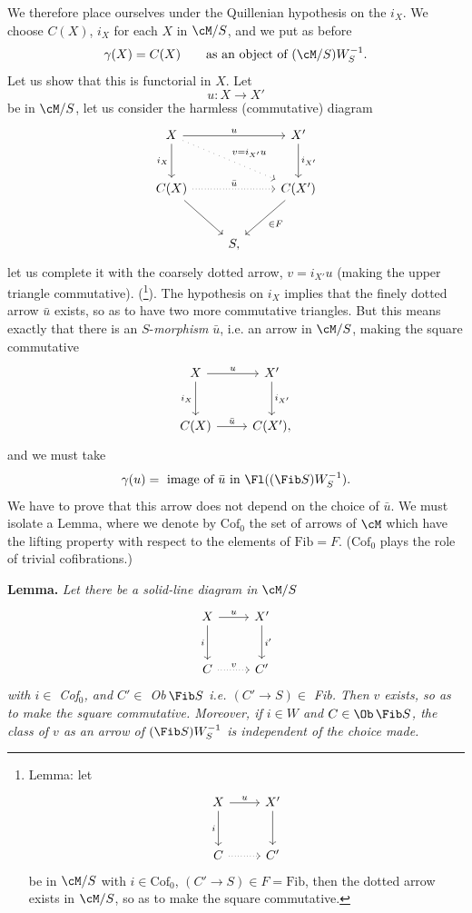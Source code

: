 We therefore place ourselves under the Quillenian hypothesis on the $i_X$. We choose $C(X)$, $i_X$ for
each $X$ in $\cM/S$, and we put as before
\[
\gamma(X)=C(X) \qquad \text{as an object of $(\cM/S)W_S^{-1}$.}
\]
Let us show that this is functorial in $X$. Let
\[
u:X\longrightarrow X'
\]
be in $\cM/S$, let us consider the harmless (commutative) diagram
\[
\begin{tikzcd}[row sep=large]
X \arrow[rr, "u"] \arrow[d, "i_X"'] \arrow[drr, loosely dotted, "v=i_{X'}u"] & & X' \arrow[d, "i_{X'}"] \\
C(X) \arrow[rr, dotted, "\bar{u}"] \arrow[dr] & & C(X') \arrow[dl, "\in F"] \\
& S, &
\end{tikzcd}
\]
let us complete it with the coarsely dotted arrow, $v=i_{X'}u$ (making the upper triangle
commutative). (\footnote[54]{Lemma: let
\[
\begin{tikzcd}[ampersand replacement=\&, row sep=large]
X \arrow[r, "u"] \arrow[d, "i"'] \& X' \arrow[d] \\
C \arrow[r, dotted] \& C'
\end{tikzcd}
\]
be in $\cM/S$ with $i\in\mathrm{Cof}_0$, $(C'\longrightarrow S)\in F=\mathrm{Fib}$, then the dotted arrow exists in $\cM/S$, so as
to make the square commutative.}). The hypothesis on $i_X$ implies that the finely dotted arrow $\bar{u}$ exists,
so as to have two more commutative triangles. But this means exactly that there is
an $S$-\textit{morphism} $\bar{u}$, i.e. an arrow in $\cM/S$, making the square commutative
\[
\begin{tikzcd}[row sep=large]
X \arrow[r, "u"] \arrow[d, "i_X"'] & X' \arrow[d, "i_{X'}"] \\
C(X) \arrow[r, "\bar{u}"] & C(X'),
\end{tikzcd}
\]
and we must take
\[
\gamma(u)=\ \text{image of $\bar{u}$ in $\Fl((\Fib S)W_S^{-1})$.}
\]
We have to prove that this arrow does not depend on the choice of $\bar{u}$. We must isolate a Lemma,
where we denote by $\mathrm{Cof}_0$ the set of arrows of $\cM$ which have %
the lifting property with
respect to the elements of $\mathrm{Fib}=F$. ($\mathrm{Cof}_0$ plays the role of trivial cofibrations.)

\textbf{Lemma.} \textit{Let there be a solid-line diagram in $\cM/S$}
\[
\begin{tikzcd}[row sep=large]
X \arrow[r, "u"] \arrow[d, "i"'] & X' \arrow[d, "i'"] \\
C \arrow[r, dotted, "v"] & C'
\end{tikzcd}
\]
\textit{with $i\in$ Cof$_0$, and $C'\in$ Ob$\,\Fib S$ i.e. $(C'\longrightarrow S)\in$ Fib. Then $v$ exists, so as to make
the square commutative. Moreover, if $i\in W$ and $C\in\Ob\,\Fib S$, the class of $v$ as an arrow of
$(\Fib S)W_S^{-1}$ is independent of the choice made.}

